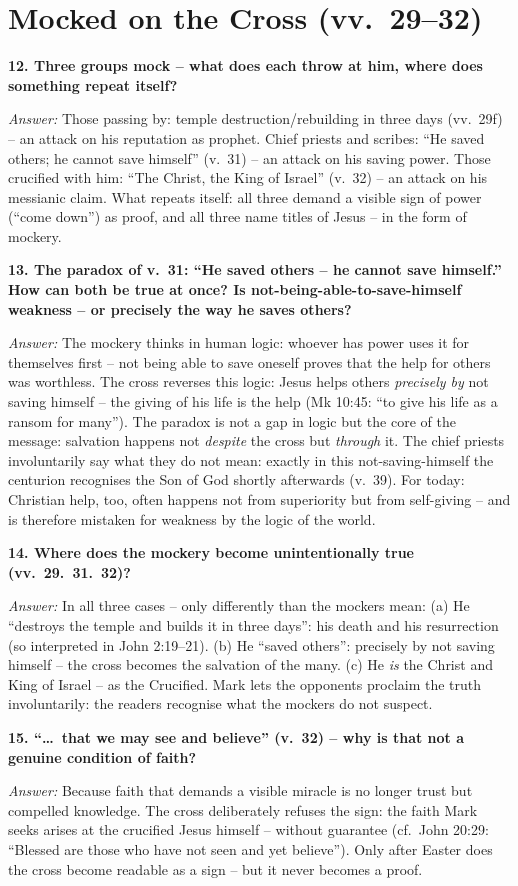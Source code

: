 \documentclass[12pt,a4paper]{article}
\newcommand{\frage}[1]{\par\vspace{0.7em}\noindent\textbf{#1}\par}
\newcommand{\antwort}[1]{\par\noindent\textit{Answer:} #1\par}
\begin{document}
\section*{Mocked on the Cross (vv.~29--32)}

\frage{12. Three groups mock -- what does each throw at him, where does something repeat itself?}
\antwort{Those passing by: temple destruction/rebuilding in three days (vv.~29f) -- an attack on his reputation as prophet. Chief priests and scribes: ``He saved others; he cannot save himself'' (v.~31) -- an attack on his saving power. Those crucified with him: ``The Christ, the King of Israel'' (v.~32) -- an attack on his messianic claim. What repeats itself: all three demand a visible sign of power (``come down'') as proof, and all three name titles of Jesus -- in the form of mockery.}

\frage{13. \textbf{The paradox of v.~31}: ``He saved others -- he cannot save himself.'' How can both be true at once? Is not-being-able-to-save-himself weakness -- or precisely the way he saves others?}
\antwort{The mockery thinks in human logic: whoever has power uses it for themselves first -- not being able to save oneself proves that the help for others was worthless. The cross reverses this logic: Jesus helps others \emph{precisely by} not saving himself -- the giving of his life is the help (Mk 10:45: ``to give his life as a ransom for many''). The paradox is not a gap in logic but the core of the message: salvation happens not \emph{despite} the cross but \emph{through} it. The chief priests involuntarily say what they do not mean: exactly in this not-saving-himself the centurion recognises the Son of God shortly afterwards (v.~39). For today: Christian help, too, often happens not from superiority but from self-giving -- and is therefore mistaken for weakness by the logic of the world.}

\frage{14. Where does the mockery become unintentionally true (vv.~29.~31.~32)?}
\antwort{In all three cases -- only differently than the mockers mean: (a) He ``destroys the temple and builds it in three days'': his death and his resurrection (so interpreted in John 2:19--21). (b) He ``saved others'': precisely by not saving himself -- the cross becomes the salvation of the many. (c) He \emph{is} the Christ and King of Israel -- as the Crucified. Mark lets the opponents proclaim the truth involuntarily: the readers recognise what the mockers do not suspect.}

\frage{15. ``\ldots\ that we may see and believe'' (v.~32) -- why is that not a genuine condition of faith?}
\antwort{Because faith that demands a visible miracle is no longer trust but compelled knowledge. The cross deliberately refuses the sign: the faith Mark seeks arises at the crucified Jesus himself -- without guarantee (cf.~John 20:29: ``Blessed are those who have not seen and yet believe''). Only after Easter does the cross become readable as a sign -- but it never becomes a proof.}
\end{document}
